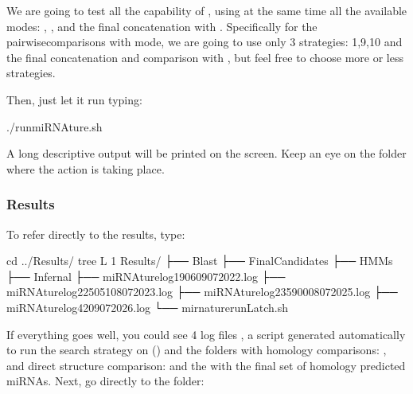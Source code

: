 \documentclass[letterpaper,10pt,english]{sphinxmanual}
\begin{document}
We are going to test all the capability of , using at the same time
all the available modes: , ,  and the final
concatenation with . Specifically for the pairwise\sphinxhyphen{}comparisons with
 mode, we are going to use only 3 strategies: 1,9,10 and the final
concatenation and comparison with , but feel free to choose more or less
strategies.

Then, just let it run typing:

\begin{sphinxVerbatim}[commandchars=\\\{\}]
\PYGZdl{}./run\PYGZus{}miRNAture.sh
\end{sphinxVerbatim}

A long descriptive output will be printed on the screen. Keep an eye on the 
folder where the action is taking place.


\subsubsection{Results}
\label{\detokenize{tutorial:results}}
To refer directly to the results, type:

\begin{sphinxVerbatim}[commandchars=\\\{\}]
\PYGZdl{} cd ../Results/
\PYGZdl{} tree \PYGZhy{}L 1
Results/
├── Blast
├── Final\PYGZus{}Candidates
├── HMMs
├── Infernal
├── miRNAture\PYGZus{}log\PYGZus{}190609072022.log
├── miRNAture\PYGZus{}log\PYGZus{}22505108072023.log
├── miRNAture\PYGZus{}log\PYGZus{}23590008072025.log
├── miRNAture\PYGZus{}log\PYGZus{}4209072026.log
└── mirnature\PYGZus{}runLatch.sh
\end{sphinxVerbatim}

If everything goes well, you could see 4 log files , a
script generated automatically to run the search strategy on 
() and the folders with homology comparisons: ,
 and direct structure comparison:  and the 
with the final set of homology predicted miRNAs. Next, go directly to the
 folder:
\end{document}
